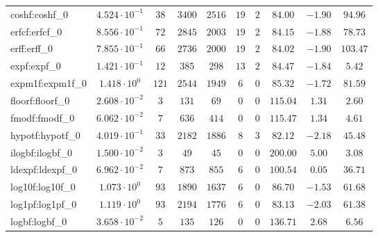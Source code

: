\begin{tabular}{|l|c|c|c|c|c|c|c|c|c|}
coshf:coshf\_0               & $ 4.524 \cdot 10^{-1} $ & $ 38     $ & $ 3400  $ & $ 2516  $ & $ 19  $ & $ 2  $ & $ 84.00       $ & $ -1.90   $ & $ 94.96   $ \\
erfcf:erfcf\_0               & $ 8.556 \cdot 10^{-1} $ & $ 72     $ & $ 2845  $ & $ 2003  $ & $ 19  $ & $ 2  $ & $ 84.15       $ & $ -1.88   $ & $ 78.73   $ \\
erff:erff\_0                 & $ 7.855 \cdot 10^{-1} $ & $ 66     $ & $ 2736  $ & $ 2000  $ & $ 19  $ & $ 2  $ & $ 84.02       $ & $ -1.90   $ & $ 103.47  $ \\
expf:expf\_0                 & $ 1.421 \cdot 10^{-1} $ & $ 12     $ & $ 385   $ & $ 298   $ & $ 13  $ & $ 2  $ & $ 84.47       $ & $ -1.84   $ & $ 5.42    $ \\
expm1f:expm1f\_0             & $ 1.418 \cdot 10^{0}  $ & $ 121    $ & $ 2544  $ & $ 1949  $ & $ 6   $ & $ 0  $ & $ 85.32       $ & $ -1.72   $ & $ 81.59   $ \\
floorf:floorf\_0             & $ 2.608 \cdot 10^{-2} $ & $ 3      $ & $ 131   $ & $ 69    $ & $ 0   $ & $ 0  $ & $ 115.04      $ & $ 1.31    $ & $ 2.60    $ \\
fmodf:fmodf\_0               & $ 6.062 \cdot 10^{-2} $ & $ 7      $ & $ 636   $ & $ 414   $ & $ 0   $ & $ 0  $ & $ 115.47      $ & $ 1.34    $ & $ 4.61    $ \\
hypotf:hypotf\_0             & $ 4.019 \cdot 10^{-1} $ & $ 33     $ & $ 2182  $ & $ 1886  $ & $ 8   $ & $ 3  $ & $ 82.12       $ & $ -2.18   $ & $ 45.48   $ \\
ilogbf:ilogbf\_0             & $ 1.500 \cdot 10^{-2} $ & $ 3      $ & $ 49    $ & $ 45    $ & $ 0   $ & $ 0  $ & $ 200.00      $ & $ 5.00    $ & $ 3.08    $ \\
ldexpf:ldexpf\_0             & $ 6.962 \cdot 10^{-2} $ & $ 7      $ & $ 873   $ & $ 855   $ & $ 6   $ & $ 0  $ & $ 100.54      $ & $ 0.05    $ & $ 36.71   $ \\
log10f:log10f\_0             & $ 1.073 \cdot 10^{0}  $ & $ 93     $ & $ 1890  $ & $ 1637  $ & $ 6   $ & $ 0  $ & $ 86.70       $ & $ -1.53   $ & $ 61.68   $ \\
log1pf:log1pf\_0             & $ 1.119 \cdot 10^{0}  $ & $ 93     $ & $ 2194  $ & $ 1776  $ & $ 6   $ & $ 0  $ & $ 83.13       $ & $ -2.03   $ & $ 61.38   $ \\
logbf:logbf\_0               & $ 3.658 \cdot 10^{-2} $ & $ 5      $ & $ 135   $ & $ 126   $ & $ 0   $ & $ 0  $ & $ 136.71      $ & $ 2.68    $ & $ 6.56    $ \\

\end{tabular}
